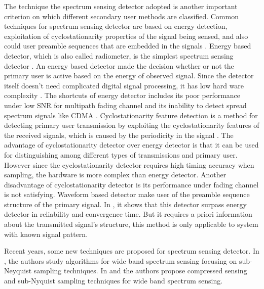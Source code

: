 \documentclass{report}
\begin{document}
\begin{spacing}{2.0}
The technique the spectrum sensing detector adopted is another important criterion on which different secondary user methods are classified.  
Common techniques for spectrum sensing detector are based on energy detection, exploitation of cyclostationarity properties of the signal being sensed, and also could user preamble sequences that are embedded in the signals \cite{cabric2004implementation}. 
Energy based detector, which is also called radiometer, is the simplest spectrum sensing detector \cite{poor1994introduction}. An energy based detector made the decision whether or not the primary user is active based on the energy of observed signal. 
Since the detector itself doesn't need complicated digital signal processing, it has low hard ware complexity \cite{ma2009signal}. The shortcuts of energy detector includes its poor performance under low SNR for multipath fading channel and its inability to detect spread spectrum signals like CDMA \cite{urkowitz1967energy}. 
Cyclostationarity feature detection is a method for detecting primary user transmission by exploiting the cyclostationarity features of the received signals, which is caused by the periodicity in the signal \cite{goldsmith2009breaking}. The advantage of cyclostationarity detector over energy detector is that it can be used for distinguishing among different types of transmissions and primary user. However since the cyclostationarity detector requires high timing accuracy when sampling, the hardware is more complex than energy detector. Another disadvantage of cyclostationarity detector is its performance under fading channel is not satisfying.   
Waveform based detector make user of the preamble sequence structure of the primary signal. In \cite{tang2005some}, it shows that this detector surpass energy detector in reliability and convergence time. But it requires a priori information about the transmitted signal's structure, this method is only applicable to system with known signal pattern.  

Recent years, some new techniques are proposed for spectrum sensing detector. 
 In \cite{tian2007compressed}, the authors study algorithms for wide band spectrum sensing focusing on sub-Neyquist sampling techniques. In  \cite{sun2013wideband} and  \cite{sun2013wideband2} the authors propose compressed sensing and sub-Nyquist sampling techniques for wide band spectrum sensing.


\end{spacing}
\end{document}
